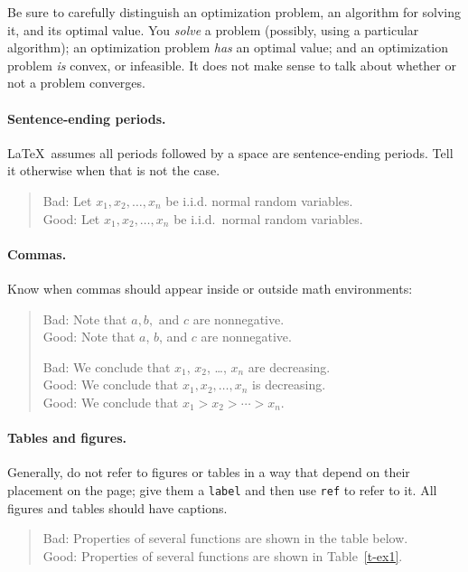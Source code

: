 \documentclass{article}
\begin{document}
Be sure to carefully distinguish an optimization problem, an algorithm for solving it, and its optimal value.
You \emph{solve} a problem (possibly, using a particular algorithm); an optimization problem \emph{has} an optimal value; and an optimization problem \emph{is} convex, or infeasible.
It does not make sense to talk about whether or not a problem converges.

\paragraph{Sentence-ending periods.}
\LaTeX\ assumes all periods followed by a space are sentence-ending periods.
Tell it otherwise when that is not the case.
\begin{quote}
    Bad: Let $x_1,x_2,\ldots ,x_n$ be  i.i.d. normal random variables.\\
    Good: Let $x_1,x_2,\ldots ,x_n$ be  i.i.d.\ normal random variables.
\end{quote}

\paragraph{Commas.}
Know when commas should appear inside or outside math environments:
\begin{quote}
    Bad: Note that $a,b,$ and $c$ are nonnegative.\\
    Good: Note that $a$, $b$, and $c$ are nonnegative.

    Bad: We conclude that $x_1$, $x_2$, \dots, $x_n$ are decreasing.\\
    Good: We conclude that $x_1, x_2, \ldots, x_n$ is decreasing.\\
    Good: We conclude that $x_1>x_2> \cdots >x_n$.
\end{quote}

\paragraph{Tables and figures.}
Generally, do not refer to figures or tables in a way that depend on their placement on the page; give them a \texttt{label} and then use \texttt{ref} to refer to it. All figures and tables should have captions.
\begin{quote}
    Bad: Properties of several functions are shown in the table below.\\
    Good: Properties of several functions are shown in Table~\ref{t-ex1}.
\end{quote}
\end{document}
